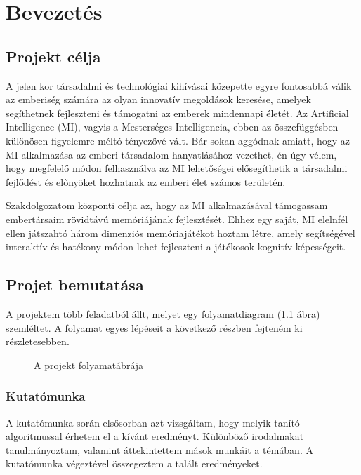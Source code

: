 \chapter{Bevezetés}
\usetikzlibrary{shapes,arrows}

\thispagestyle{fancy}
\pagestyle{fancy}
\section{Projekt célja}
A jelen kor társadalmi és technológiai kihívásai közepette egyre fontosabbá válik az emberiség számára az olyan innovatív megoldások keresése, amelyek segíthetnek fejleszteni és támogatni az emberek mindennapi életét. Az Artificial Intelligence (MI), vagyis a Mesterséges Intelligencia, ebben az összefüggésben különösen figyelemre méltó tényezővé vált. Bár sokan aggódnak amiatt, hogy az MI alkalmazása az emberi társadalom hanyatlásához vezethet, én úgy vélem, hogy  megfelelő módon felhasználva az MI lehetőségei elősegíthetik a társadalmi fejlődést és előnyöket hozhatnak az emberi élet számos területén.

Szakdolgozatom központi célja az, hogy az MI alkalmazásával támogassam embertársaim rövidtávú memóriájának fejlesztését.
Ehhez egy saját, MI elelnfél ellen játszahtó három dimenziós memóriajátékot hoztam létre, amely segítségével interaktív és hatékony módon lehet fejleszteni a játékosok kognitív képességeit. 
\section{Projet bemutatása}

A projektem több feladatból állt, melyet egy folyamatdiagram (\ref{fig:folyamat_diagram} ábra) szemléltet. A folyamat egyes lépéseit a következő részben fejteném ki részletesebben.
\begin{figure}[H]
    \centering
    
    \caption{A projekt folyamatábrája}
    \label{fig:folyamat_diagram}
\end{figure}

\subsection{Kutatómunka}
A kutatómunka során elsősorban azt vizsgáltam, hogy melyik tanító algoritmussal érhetem el a kívánt eredményt. Különböző irodalmakat tanulmányoztam, valamint áttekintettem mások munkáit a témában. A kutatómunka végeztével összegeztem a talált eredményeket.

